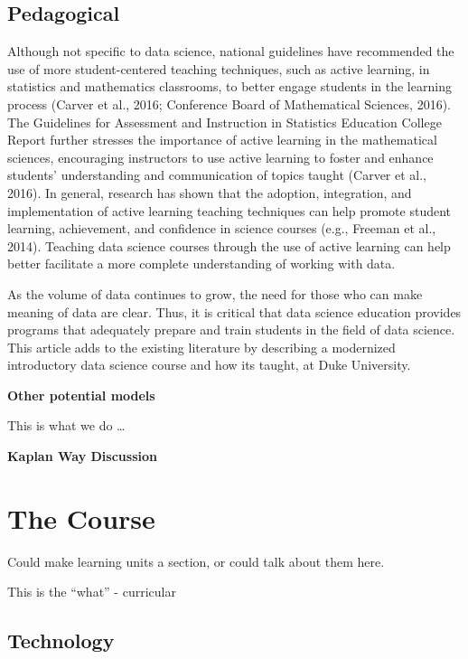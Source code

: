 \documentclass[
  12pt]{article}
\begin{document}
\hypertarget{sec-ped}{%
\subsection{Pedagogical}\label{sec-ped}}

Although not specific to data science, national guidelines have
recommended the use of more student-centered teaching techniques, such
as active learning, in statistics and mathematics classrooms, to better
engage students in the learning process (Carver et al., 2016; Conference
Board of Mathematical Sciences, 2016). The Guidelines for Assessment and
Instruction in Statistics Education College Report further stresses the
importance of active learning in the mathematical sciences, encouraging
instructors to use active learning to foster and enhance students'
understanding and communication of topics taught (Carver et al., 2016).
In general, research has shown that the adoption, integration, and
implementation of active learning teaching techniques can help promote
student learning, achievement, and confidence in science courses (e.g.,
Freeman et al., 2014). Teaching data science courses through the use of
active learning can help better facilitate a more complete understanding
of working with data.

As the volume of data continues to grow, the need for those who can make
meaning of data are clear. Thus, it is critical that data science
education provides programs that adequately prepare and train students
in the field of data science. This article adds to the existing
literature by describing a modernized introductory data science course
and how its taught, at Duke University.

\textbf{Other potential models}

This is what we do \ldots{}

\textbf{Kaplan Way Discussion}

\hypertarget{the-course}{%
\section{The Course}\label{the-course}}

Could make learning units a section, or could talk about them here.

This is the ``what'' - curricular

\hypertarget{technology}{%
\subsection{Technology}\label{technology}}
\end{document}
